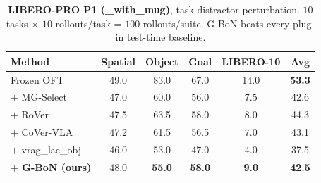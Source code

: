 \begin{table}[h]
\centering
\caption{\textbf{LIBERO-Plus libero\_spatial per perturbation dimension}
(success rate \%, $n=30$ tasks $\times$ 1 rollout per dim, seed=7).
\textbf{G-BoN beats every other method on the suite-average} ($+3.2$~pp
over the strongest baseline) and wins 5 of 7 per-dim cells. Bold = best
non-frozen.}
\label{tab:lplus_spatial}
\end{table}

\begin{table}[h]
\centering
\caption{\textbf{LIBERO-PRO P1 (\_with\_mug)}, task-distractor perturbation.
$10$ tasks $\times$ $10$ rollouts/task = $100$ rollouts/suite. G-BoN beats
every plug-in test-time baseline.}
\label{tab:lpro}
\begin{tabular}{lccccc}
\toprule
Method & Spatial & Object & Goal & LIBERO-10 & \textbf{Avg} \\
\midrule
Frozen OFT                        & 49.0 & 83.0 & 67.0 & 14.0 & \textbf{53.3} \\
$+$ MG-Select \citep{mgselect2026}     & 47.0 & 60.0 & 56.0 & 7.5 & 42.6 \\
$+$ RoVer \citep{rover2026}            & 47.5 & 63.5 & 58.0 & 8.0 & 44.3 \\
$+$ CoVer-VLA                     & 47.2 & 61.5 & 56.5 & 7.0 & 43.1 \\
$+$ vrag\_lac\_obj                & 46.0 & 53.0 & 47.0 &  4.0 & 37.5 \\
\textbf{$+$ G-BoN (ours)}         & 48.0 & \textbf{55.0} & \textbf{58.0} & \textbf{9.0} & \textbf{42.5} \\
\bottomrule
\end{tabular}
\end{table}


